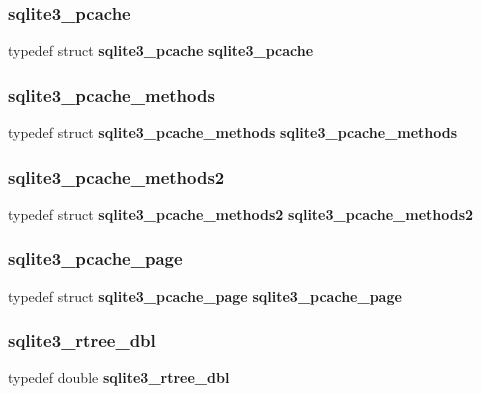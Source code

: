 \subsubsection{sqlite3\_pcache}
{\footnotesize\ttfamily typedef struct \textbf{ sqlite3\+\_\+pcache} \textbf{ sqlite3\+\_\+pcache}}

\mbox{\label{sqlite3_8h_ad20707fd3d12a273e2b37c0514d4a244}} 
\subsubsection{sqlite3\_pcache\_methods}
{\footnotesize\ttfamily typedef struct \textbf{ sqlite3\+\_\+pcache\+\_\+methods} \textbf{ sqlite3\+\_\+pcache\+\_\+methods}}

\mbox{\label{sqlite3_8h_a716eaf355944e19206ac81ba4e97a889}} 
\subsubsection{sqlite3\_pcache\_methods2}
{\footnotesize\ttfamily typedef struct \textbf{ sqlite3\+\_\+pcache\+\_\+methods2} \textbf{ sqlite3\+\_\+pcache\+\_\+methods2}}

\mbox{\label{sqlite3_8h_a293bd5fa4e7e7d147ecd6e85e98e11a0}} 
\subsubsection{sqlite3\_pcache\_page}
{\footnotesize\ttfamily typedef struct \textbf{ sqlite3\+\_\+pcache\+\_\+page} \textbf{ sqlite3\+\_\+pcache\+\_\+page}}

\mbox{\label{sqlite3_8h_ae9156ff58620c1ceae9391f1afabae1b}} 
\subsubsection{sqlite3\_rtree\_dbl}
{\footnotesize\ttfamily typedef double \textbf{ sqlite3\+\_\+rtree\+\_\+dbl}}

